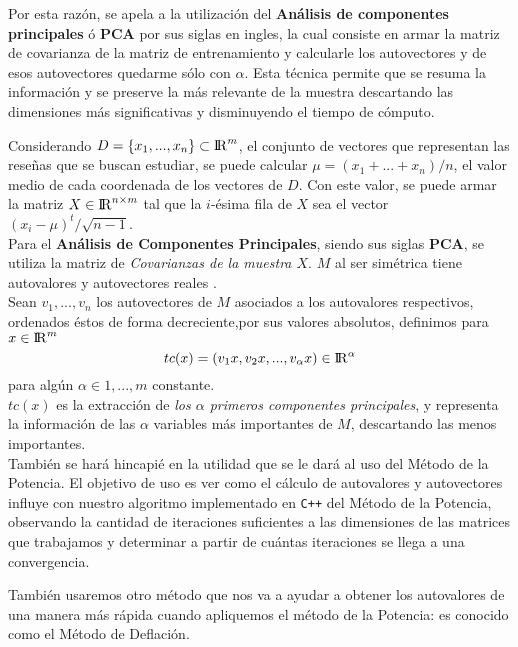 Por esta razón, se apela a la utilización del \textbf{Análisis de componentes principales} ó \textbf{PCA} por sus siglas en ingles, la cual consiste en armar la matriz de covarianza de la matriz de entrenamiento y calcularle los autovectores y de esos autovectores quedarme sólo con $\alpha$. Esta técnica permite que se resuma la información y se preserve la más relevante de la muestra descartando las dimensiones más significativas y disminuyendo el tiempo de cómputo.


Considerando $D = \{x_{1},...,x_{n}\} \subset {\rm I\!R}^{m}$, el conjunto de vectores que representan las reseñas que se buscan estudiar, se puede calcular $\mu = (x_{1}+...+x_{n})/n$, el valor medio de cada coordenada de los vectores de $D$. Con este valor, se puede armar la matriz $X \in {\rm I\!R}^{n \times m}$ tal que la $i$-ésima fila de $X$ sea el vector $(x_{i}-\mu)^{t} / \sqrt{n-1}$. \\
Para el \textbf{Análisis de Componentes Principales}, siendo sus siglas \textbf{PCA}, se utiliza la matriz de \textit{Covarianzas de la muestra $X$}. $M$ al ser simétrica tiene autovalores y autovectores reales \cite{Burden}.\\%
Sean $v_{1},...,v_{n}$ los autovectores de $M$ asociados a los autovalores respectivos, ordenados éstos de forma decreciente,por sus valores absolutos, definimos para $x \in {\rm I\!R}^{m}$
\begin{equation*}
  tc(x) = (v_{1} x,v_{2} x,...,v_{\alpha} x) \in {\rm I\!R}^{\alpha}
  \label{def:alfa}
\end{equation*}
para algún $\alpha \in 1,...,m$ constante.\\
$tc(x)$ es la extracción de \textit{los $\alpha$ primeros componentes principales}, y representa la información de las $\alpha$ variables más importantes de $M$, descartando las menos importantes.\\


También se hará hincapié en la utilidad que se le dará al uso del Método de la Potencia\cite{Burden_potencia}. El objetivo de uso es ver como el cálculo de autovalores y autovectores influye con nuestro algoritmo implementado en \texttt{C++} del Método de la Potencia, observando la cantidad de iteraciones suficientes a las dimensiones de las matrices que trabajamos y determinar a partir de cuántas iteraciones se llega a una convergencia. 

También usaremos otro método que nos va a ayudar a obtener los autovalores de una manera más rápida cuando apliquemos el método de la Potencia: es conocido como el Método de Deflación\cite{Argos}.

